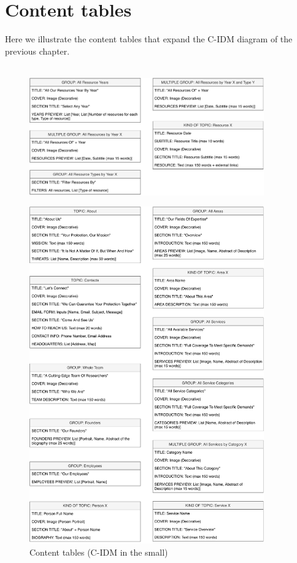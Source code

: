 \documentclass[12pt]{report}
\begin{document}
\chapter{Content tables}
Here we illustrate the content tables that expand the C-IDM diagram of the previous 
chapter.\\\\
\begin{figure}[h]
	\centering
	\includegraphics[width=0.9\textwidth]{content_tables_pt2.pdf}
\end{figure}
\begin{figure}[h]
	\centering
	\includegraphics[width=0.9\textwidth]{content_tables_pt1.pdf}
	\caption{Content tables (C-IDM in the small)}
\end{figure}
\end{document}
